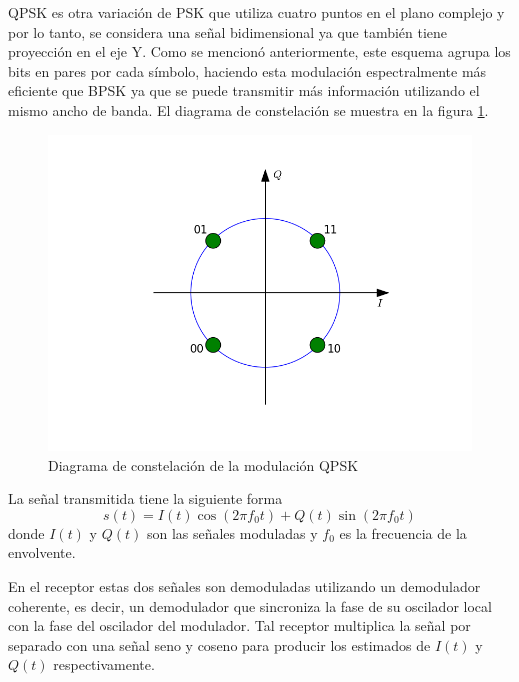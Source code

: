 QPSK es otra variaci\'on de PSK que utiliza cuatro puntos en el plano complejo y
por lo tanto, se considera una se\~nal bidimensional ya que tambi\'en tiene
proyecci\'on en el eje Y. Como se mencion\'o anteriormente, este esquema agrupa
los bits en pares por cada s\'imbolo, haciendo esta modulaci\'on espectralmente
m\'as eficiente que BPSK ya que se puede transmitir m\'as informaci\'on
utilizando el mismo ancho de banda. El diagrama de constelaci\'on se muestra en
la figura \ref{fig:qpskconst}.
\begin{figure}[hpt]
\centering
	\includegraphics[width=5.5in]{figs/qpsk}
	\caption{Diagrama de constelaci\'on de la modulaci\'on QPSK}
	\label{fig:qpskconst}
\end{figure}

La se\~nal transmitida tiene la siguiente forma \cite{sklar}
\begin{equation}\label{eq:transmit}
s(t)=I(t)\cos(2\pi f_0t)+Q(t)\sin(2\pi f_0t)
\end{equation}
donde $I(t)$ y $Q(t)$ son las se\~nales moduladas y $f_0$ es la frecuencia de la
envolvente.

En el receptor estas dos se\~nales son demoduladas utilizando un demodulador
coherente, es decir, un demodulador que sincroniza la fase de su oscilador
local con la fase del oscilador del modulador. Tal receptor multiplica la
se\~nal por separado con una se\~nal seno y coseno para producir los estimados
de $I(t)$ y $Q(t)$ respectivamente.

